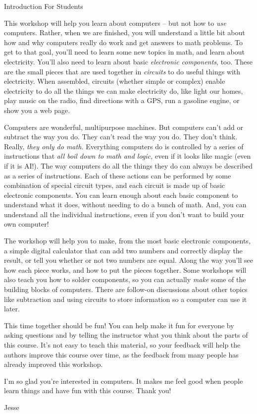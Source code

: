 \documentclass[12pt]{article}
\begin{document}
\pagestyle{empty}

\begin{center}\begin{Large}Introduction For Students\end{Large}\end{center}

This workshop will help you learn about computers -- but not how to \emph{use} computers. Rather, when we are finished, you will understand a little bit about how and why computers really do work and get answers to math problems. To get to that goal, you'll need to learn some new topics in math, and learn about electricity. You'll also need to learn about basic \emph{electronic components}, too. These are the small pieces that are used together in \emph{circuits} to do useful things with electricity. When assembled, circuits (whether simple or complex) enable electricity to do all the things we can make electricity do, like light our homes, play music on the radio, find directions with a GPS, run a gasoline engine, or show you a web page.

Computers are wonderful, multipurpose machines. But computers can't add or subtract the way you do. They can't read the way you do. They don't think. Really,  \emph{they only do math.} Everything computers do is controlled by a series of instructions that \emph{all boil down to math and logic,} even if it looks like magic (even if it is AI!). The way computers do all the things they do can always be described as a series of instructions. Each of these actions can be performed by some combination of special circuit types, and each circuit is made up of basic electronic components. You can learn enough about each basic component to understand what it does, without needing to do a bunch of math. And, you can understand all the individual instructions, even if you don't want to build your own computer!

The workshop will help you to make, from the most basic electronic components, a simple digital calculator that can add two numbers and correctly display the result, or tell you whether or not two numbers are equal. Along the way you'll see how each piece works, and how to put the pieces together. Some workshops will also teach you how to solder components, so you can actually \emph{make} some of the building blocks of computers. There are follow-on discussions about other topics like subtraction and using circuits to store information so a computer can use it later.

This time together should be fun! You can help make it fun for everyone by asking questions and by telling the instructor what you think about the parts of this course. It's not easy to teach this material, so your feedback will help the authors improve this course over time, as the feedback from many people has already improved this workshop.

I'm so glad you're interested in computers. It makes me feel good when people learn things and have fun with this course. Thank you!

\bigskip

Jesse
\end{document}
